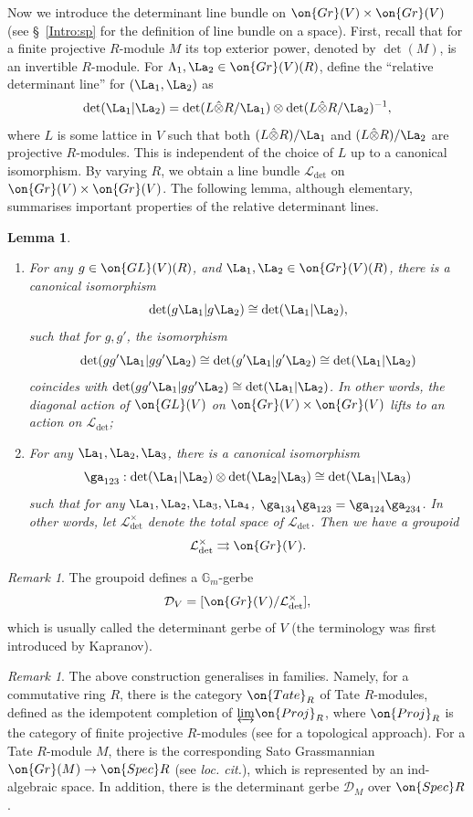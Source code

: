 \documentclass[]{pcmi}
\theoremstyle{plain}
\newtheorem{lem}[equation]{Lemma}
\theoremstyle{remark}
\newtheorem{rmk}[equation]{Remark}
\theoremstyle{definition}
\newcommand{\bG}{{\mathbb G}}
\newcommand{\mD}{{\mathcal D}}
\newcommand{\mL}{{\mathcal L}}
\newcommand{\Gr}{{\on{Gr}}}
\newcommand{\Spec}{\on{Spec}}
\newcommand{\GL}{{\on{GL}}}
\begin{document}
 Now we introduce the determinant line bundle on $\Gr(V)\times \Gr(V)$ (see \S~\ref{Intro:sp} for the definition of line bundle on a space).
First, recall that for a finite projective $R$-module $M$ its top exterior power, denoted by $\det(M)$, is an invertible $R$-module.
For $\Lambda_1,\La_2\in\Gr(V)(R)$, define the ``relative determinant line'' for $(\La_1,\La_2)$ as
\[\det(\La_1|\La_2)=\det(L\hat\otimes R/\La_1)\otimes \det(L\hat\otimes R/\La_2)^{-1},\]
where $L$ is some lattice in $V$ such that both $(L\hat\otimes R)/\La_1$ and $(L\hat\otimes R)/\La_2$ are projective $R$-modules. This is independent of the choice of $L$ up to a canonical isomorphism. By varying $R$, we obtain a line bundle $\mL_{\det}$ on $\Gr(V)\times\Gr(V)$. The following lemma, although elementary, summarises important properties of the relative determinant lines.
\begin{lem}~
\begin{enumerate} 
\item For any $g\in  \GL(V)(R)$, and $\La_1,\La_2\in\Gr(V)(R)$, there is a canonical isomorphism $$\det(g\La_1|g\La_2)\cong\det(\La_1|\La_2),$$ such that  for $g,g'$, the isomorphism $$\det(gg'\La_1|gg'\La_2)\cong\det(g'\La_1|g'\La_2)\cong\det(\La_1|\La_2)$$ coincides with $\det(gg'\La_1|gg'\La_2)\cong\det(\La_1|\La_2)$. In other words, the diagonal action of $\GL(V)$ on $\Gr(V)\times\Gr(V)$ lifts to an action on $\mL_{\det}$;

\item For any $\La_1,\La_2,\La_3$, there is a canonical isomorphism \[\ga_{123}:\det(
\La_1|\La_2)\otimes\det(\La_2|\La_3)\cong\det(\La_1|\La_3)\] such that for any $\La_1,\La_2,\La_3,\La_4$, $\ga_{134}\ga_{123}=\ga_{124}\ga_{234}$.
In other words, let $\mL_{\det}^\times$ denote the total space of $\mL_{\det}$. Then we have a groupoid 
$$\mL_{\det}^\times\rightrightarrows\Gr(V).$$
\end{enumerate}
\end{lem}
\begin{rmk}
The groupoid defines a $\bG_m$-gerbe 
\[\mD_V=[\Gr(V)/ \mL_{\det}^\times],\] 
which is usually called the determinant gerbe of $V$ (the terminology was first introduced by Kapranov).
\end{rmk} 

\begin{rmk}
The above construction generalises in families. Namely, for a commutative ring $R$, there is the category $\on{Tate}_R$ of Tate $R$-modules, defined as the idempotent completion of $\underleftrightarrow{\lim}\on{Proj}_R$, where $\on{Proj}_R$ is the category of finite projective $R$-modules  (see \cite{Dr} for a topological approach). For a Tate $R$-module $M$, there is the corresponding Sato Grassmannian $\Gr(M)\to \Spec R$ (see \emph{loc. cit.}), which is represented by an ind-algebraic space. In addition, there is the determinant gerbe $\mD_M$ over $\Spec R$. 
\end{rmk}
\end{document}
